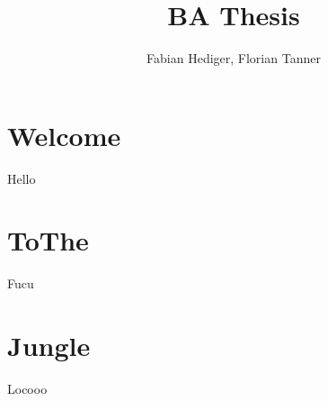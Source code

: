 




% 
% 



\title{BA Thesis}
\author{Fabian Hediger, Florian Tanner}

\setcounter{page}{1}



\section{Welcome}
Hello \cite{IEEEexample:article_typical}

\section{ToThe}
Fucu \cite{mirrorcle_userguide}

\section{Jungle}
Locooo \cite{microchip_spi}





